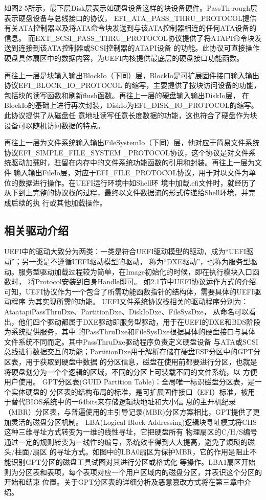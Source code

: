 如图2-5所示，最下层Disk层表示如硬盘设备这样的块设备硬件。PassTh-\newline rough层表示硬盘设备与总线接口的协议，
EFI\_ATA\_PASS\_THRU\_PROTOCOL提供有关ATA控制器以及将ATA命令块发送到与该ATA控制器相连的任何ATA设备的信息。
而EXT\_SCSI\_PASS\_THRU\_PROTOCOL协议提供了将ATAPI命令块发送到连接到该ATA控制器或SCSI控制器的ATAPI设备
的功能。此协议可直接操作硬盘具体扇区中的数据内容，为UEFI内核提供最底层的硬盘接口功能函数。
\par 再往上一层是块输入输出BlockIo（下同）层，BlockIo是可扩展固件接口输入输出协议EFI\_BLOCK\_IO\_PROTOCOL
的缩写，主要提供了按块访问设备的功能，包括块的读写函数和刷新flush函数。再往上一层的硬盘输入输出DiskIo层，
在BlockIo的基础上进行再次封装，DiskIo为EFI\_DISK\_IO\_PROTOCOL的缩写。此协议提供了从磁盘任
意地址读写任意长度数据的功能，这也符合了硬盘作为块设备可以随机访问数据的特点。
\par 再往上一层为文件系统输入输出FileSystemIo（下同）层，他对应于简易文件系统协议EFI\_SIMPLE\_FILE\_SYSTEM
\_PROTOCOL协议，这个协议是对文件系统驱动加载时，驻留在内存中的文件系统功能函数的引用和封装。再往上一层为文件
输入输出FileIo层，对应于EFI\_FILE\_PROTOCOL协议，用于对以文件为单位的数据进行操作。在UEFI运行环境中如Shell环
境中加载.efi文件时，就经历了从下到上完整的协议栈的过程，最终以文件数据流的形式传递给Shell环境，并完成后续的执
行或其他加载操作。

\subsection{相关驱动介绍}
UEFI中的驱动大致分为两类：一类是符合UEFI驱动模型的驱动，成为“UEFI驱动”；另一类是不遵循UEFI驱动模型的驱动，
称为“DXE驱动”，也称为服务型驱动。服务型驱动加载过程较为简单，在Image初始化的时候，即在执行模块入口函数时，
将Protocol安装到自身Handle即可。
如2.1节中UEFI协议运作方式的介绍可知，UEFI协议作为一个包含了所需功能函数指针的结构体，需要具体的UEFI驱动程序
为其实现所需的功能。
UEFI文件系统协议栈相关的驱动程序分别为：AtaatapiPassThruDxe、PartitionDxe、DiskIoDxe、FileSysDxe，
从命名可以看出，他们四个驱动都属于DXE驱动即服务型驱动，用于在UEFI的DXE和BDS阶段为系统提供服务，其中
的PassThruDxe和FileSysDxe根据具体的硬盘接口与具体文件系统不同而定。其中PassThruDxe驱动程序负责定义硬盘设备
与ATA或SCSI总线进行数据交互的功能；PartitionDxe用于解析存储在硬盘ESP分区中的GPT分区表，用于获取到硬盘中数据
的分区信息，磁盘在使用前都要进行分区，也就是将硬盘划分为一个个逻辑的区域，不同的分区上可装载不同的文件系统，以
方便用户使用。
GPT分区表(GUID Partition Table)：全局唯一标识磁盘分区表\cite{extra3}，是一个实体硬盘的
分区表的结构布局的标准，是可扩展固件接口（EFI）标准，被用于替代BIOS系统中的一64bits来存储逻辑块地址和大小信
息的主开机纪录（MBR）分区表，与普遍使用的主引导记录(MBR)分区方案相比，GPT提供了更加灵活的磁盘分区机制。
LBA(Logical Block Addressing)逻辑块寻址模式将CHS这种三维寻址方式转变为一维的线性寻址，它把硬盘所有
物理扇区的C/H/S编号通过一定的规则转变为一线性的编号，系统效率得到大大提高，避免了烦琐的磁头/柱面/扇区
的寻址方式。如图中的LBA0扇区为保护MBR，它的作用是阻止不能识别GPT分区的磁盘工具试图对其进行分区或格式化
等操作。LBA1扇区开始则为分区表和表项，每个表项对应一个用户区域内的磁盘分区，并表识这个分区的开始和结束
位置。关于GPT分区表的详细分析及恶意篡改方式将在第三章中介绍。

